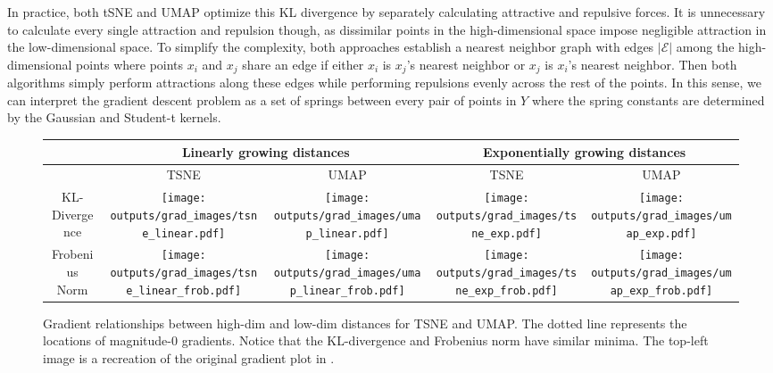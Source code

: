 \documentclass[sigconf, nonacm]{acmart}
\begin{document}
In practice, both tSNE and UMAP optimize this KL divergence by separately calculating attractive and repulsive forces. It is unnecessary to calculate
every single attraction and repulsion though, as dissimilar points in the high-dimensional space impose negligible attraction in the low-dimensional space.
To simplify the complexity, both approaches establish a nearest neighbor graph \cite{van2014accelerating} with edges $|\mathcal{E}|$ among the
high-dimensional points where points $x_i$ and $x_j$ share an edge if either $x_i$ is $x_j$'s nearest neighbor or $x_j$ is $x_i$'s nearest neighbor.
Then both algorithms simply perform attractions along these edges while performing repulsions evenly across the rest of the points. In this sense, we can
interpret the gradient descent problem as a set of springs between every pair of points in $Y$ where the spring constants are determined by the Gaussian and
Student-t kernels.


\begin{figure*}[h]
    \begin{tabular}{|c|c|c|c|c|}
        \hline
        & \multicolumn{2}{|c|}{Linearly growing distances} & \multicolumn{2}{|c|}{Exponentially growing distances} \\
        \hline
        & TSNE & UMAP & TSNE & UMAP \\
        \hline
        KL-Divergence &
        \texttt{[image: outputs/grad\_images/tsne\_linear.pdf]} & 
        \texttt{[image: outputs/grad\_images/umap\_linear.pdf]} & 
        \texttt{[image: outputs/grad\_images/tsne\_exp.pdf]} & 
        \texttt{[image: outputs/grad\_images/umap\_exp.pdf]}\\
        \hline
        Frobenius Norm &
        \texttt{[image: outputs/grad\_images/tsne\_linear\_frob.pdf]} & 
        \texttt{[image: outputs/grad\_images/umap\_linear\_frob.pdf]} & 
        \texttt{[image: outputs/grad\_images/tsne\_exp\_frob.pdf]} & 
        \texttt{[image: outputs/grad\_images/umap\_exp\_frob.pdf]}\\
        \hline
    \end{tabular}
\caption{Gradient relationships between high-dim and low-dim distances for TSNE and UMAP. The dotted line represents the locations of magnitude-$0$ gradients.
Notice that the KL-divergence and Frobenius norm have similar minima. The top-left image is a recreation of the original gradient plot in \cite{van2008visualizing}.}
\label{grad_plots}
\end{figure*}
\end{document}
